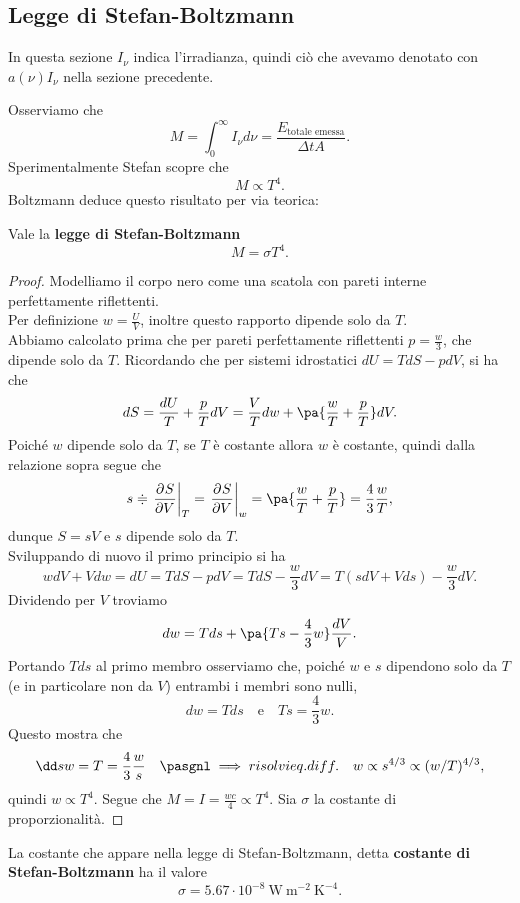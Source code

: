 \subsection{Legge di Stefan-Boltzmann}
In questa sezione $I_\nu$ indica l'irradianza, quindi ci\`o che avevamo denotato con $a(\nu)I_\nu$ nella sezione precedente.

\noindent
Osserviamo che
\[M=\int_0^\infty I_\nu d\nu=\frac{E_{\text{totale emessa}}}{\Delta t A}.\]
Sperimentalmente Stefan scopre che
\[M\propto T^4.\]
Boltzmann deduce questo risultato per via teorica:

\begin{theorem}\label{LeggeStefanBoltzmann}
Vale la \textbf{legge di Stefan-Boltzmann}
\[M=\sigma T^4.\]
\end{theorem}
\begin{proof}
Modelliamo il corpo nero come una scatola con pareti interne perfettamente riflettenti.\\
Per definizione $w=\frac UV$, inoltre questo rapporto dipende solo da $T$.\\ Abbiamo calcolato prima che per pareti perfettamente riflettenti $p=\frac w3$, che dipende solo da $T$. Ricordando che per sistemi idrostatici $dU=TdS-pdV$, si ha che
\[dS=\frac {dU}T+\frac pTdV=\frac VTdw+\pa{\frac wT+\frac pT}dV.\]
Poich\'e $w$ dipende solo da $T$, se $T$ \`e costante allora $w$ \`e costante, quindi dalla relazione sopra segue che
\[s\doteqdot\ppb VST=\ppb VSw=\pa{\frac wT+\frac pT}=\frac 43 \frac wT,\]
dunque $S=sV$ e $s$ dipende solo da $T$.\\
Sviluppando di nuovo il primo principio si ha
\[wdV+Vdw=dU=TdS-pdV=TdS-\frac w3dV=T(sdV+Vds)-\frac w3dV.\]
Dividendo per $V$ troviamo
\[dw=Tds+\pa{Ts-\frac 43w}\frac{dV}V.\]
Portando $Tds$ al primo membro osserviamo che,
poich\'e $w$ e $s$ dipendono solo da $T$ (e in particolare non da $V$) entrambi i membri sono nulli, 
\[dw=Tds\quad\text{e}\quad Ts=\frac 43w.\]
Questo mostra che
\[\dd sw=T=\frac 43\frac ws\quad\pasgnl\implies{risolvi eq. diff.}\quad w\propto s^{4/3}\propto (w/T)^{4/3},\]
quindi $w\propto T^4$.
Segue che $M=I=\frac{wc}4\propto T^4$. Sia $\sigma$ la costante di proporzionalit\`a.
\end{proof}

\begin{fact}
La costante che appare nella legge di Stefan-Boltzmann, detta \textbf{costante di Stefan-Boltzmann} ha il valore
\[\sigma=5.67\cdot 10^{-8} \ \mathrm{W}\ \mathrm{m}^{-2}\ \mathrm{K}^{-4}.\]
\end{fact}




